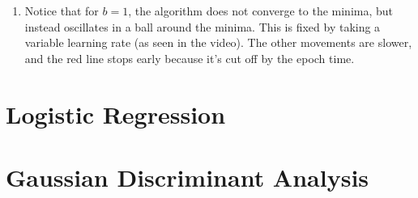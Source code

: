 \documentclass[12pt]{article}
\begin{document}
\begin{enumerate}[label=(\alph*)]
    \item \begin{center}\end{center}

    Notice that for $b=1$, the algorithm does not converge to the minima, but instead oscillates in a ball around the minima. This is fixed by taking a variable learning rate (as seen in the video). The other movements are slower, and the red line stops early because it's cut off by the epoch time.

\end{enumerate}

\section*{Logistic Regression}

\section*{Gaussian Discriminant Analysis}
\end{document}
